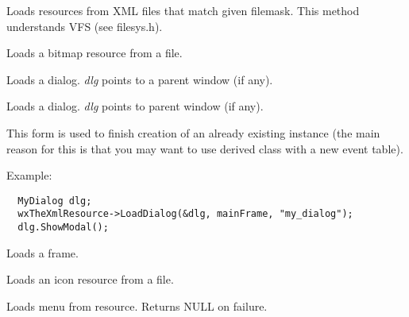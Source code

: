 
Loads resources from XML files that match given filemask.
This method understands VFS (see filesys.h).


\label{wxxmlresourceloadbitmap}


Loads a bitmap resource from a file.


\label{wxxmlresourceloaddialog}


Loads a dialog. {\it dlg} points to a parent window (if any).


Loads a dialog. {\it dlg} points to parent window (if any).

This form is used to finish creation of an already existing instance (the main reason
for this is that you may want to use derived class with a new event table).

Example:

\begin{verbatim}
  MyDialog dlg;
  wxTheXmlResource->LoadDialog(&dlg, mainFrame, "my_dialog");
  dlg.ShowModal();
\end{verbatim}


\label{wxxmlresourceloadframe}


Loads a frame.


\label{wxxmlresourceloadicon}


Loads an icon resource from a file.


\label{wxxmlresourceloadmenu}


Loads menu from resource. Returns NULL on failure.


\label{wxxmlresourceloadmenubar}

